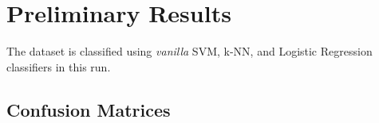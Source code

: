 \documentclass[letterpaper, 11 pt, conference]{ieeeconf}  %
\begin{document}

\section{Preliminary Results}\label{sec:result}
The dataset is classified using \textit{vanilla} SVM, k-NN, and Logistic Regression classifiers in this run.

\subsection{Confusion Matrices}
\end{document}
